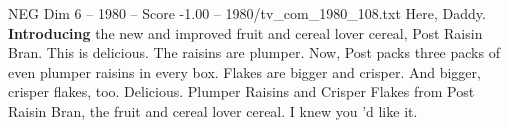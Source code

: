 \begin{textsample}{NEG Dim 6 – 1980 – Score -1.00 – 1980/tv\_com\_1980\_108.txt}  \label{ex:f6_neg_040}
Here, Daddy. \textbf{Introducing} the new and improved fruit and cereal lover cereal, Post Raisin Bran.
This is delicious.
The raisins are plumper.
Now, Post packs three packs of even plumper raisins in every box.
Flakes are bigger and crisper.
And bigger, crisper flakes, too.
Delicious.
Plumper Raisins and Crisper Flakes from Post Raisin Bran, the fruit and cereal lover cereal.
I knew you 'd like it.

\end{textsample}
